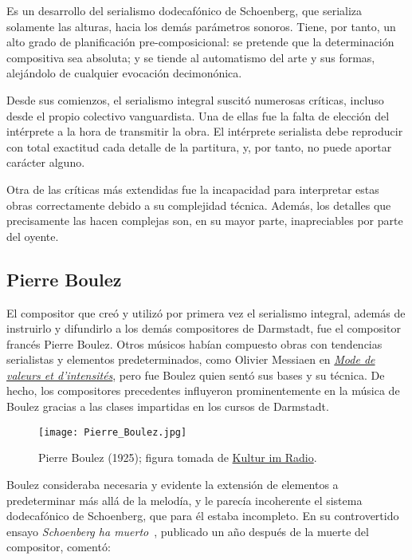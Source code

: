 	Es un desarrollo del serialismo dodecaf\'onico de Schoenberg, que serializa solamente las alturas, hacia los dem\'as par\'ametros sonoros. Tiene, por tanto, un alto grado de planificaci\'on pre-composicional: se pretende que la determinaci\'on compositiva sea absoluta; y se tiende al automatismo del arte y sus formas, alej\'andolo de cualquier evocaci\'on decimon\'onica.

	Desde sus comienzos, el serialismo integral suscit\'o numerosas cr\'iticas, incluso desde el propio colectivo vanguardista. Una de ellas fue la falta de elecci\'on del int\'erprete a la hora de transmitir la obra. El int\'erprete serialista debe reproducir con total exactitud cada detalle de la partitura, y, por tanto, no puede aportar car\'acter alguno. 
	
	Otra de las cr\'iticas m\'as extendidas fue la incapacidad para interpretar estas obras correctamente debido a su complejidad t\'ecnica. Adem\'as, los detalles que precisamente las hacen complejas son, en su mayor parte, inapreciables por parte del oyente.
	
	\subsection{Pierre Boulez}
	\label{boulez}
    El compositor que cre\'o y utiliz\'o por primera vez el serialismo integral, adem\'as de instruirlo y difundirlo a los dem\'as compositores de Darmstadt, fue el compositor franc\'es Pierre Boulez. Otros m\'usicos hab\'ian compuesto obras con tendencias serialistas y elementos predeterminados, como Olivier Messiaen en \href{https://www.youtube.com/watch?v=Rz_KRRqvID4}{\emph{Mode de valeurs et d'intensit\'es}}, pero fue Boulez quien sent\'o sus bases y su t\'ecnica. De hecho, los compositores precedentes influyeron prominentemente en la m\'usica de Boulez gracias a las clases impartidas en los cursos de Darmstadt.
    
    \begin{figure}[h]
    	\begin{center}
    		\texttt{[image: Pierre\_Boulez.jpg]}\\
    		\caption{Pierre Boulez (1925); figura tomada de \href{http://kultur-im-radio.de/blog/pierre-boulez-ich-bin-ein-wiener}{Kultur im Radio}.}
    	\end{center}
    \end{figure}
    
    Boulez consideraba necesaria y evidente la extensi\'on de elementos a predeterminar m\'as all\'a de la melod\'ia, y le parec\'ia incoherente el sistema dodecaf\'onico de Schoenberg, que para \'el estaba incompleto. En su controvertido ensayo \emph{Schoenberg ha muerto}~\cite{boulez}, publicado un a\~no despu\'es de la muerte del compositor, coment\'o:
    
